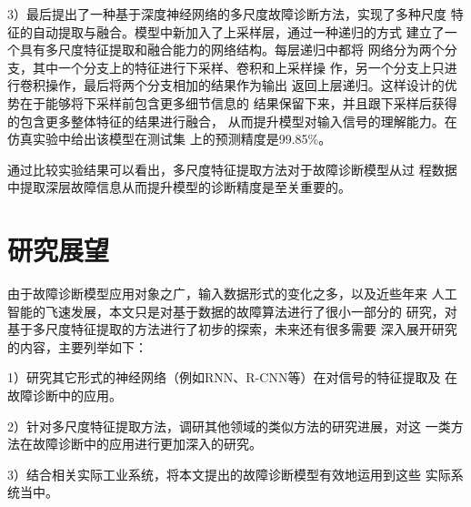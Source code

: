 3）最后提出了一种基于深度神经网络的多尺度故障诊断方法，实现了多种尺度
特征的自动提取与融合。模型中新加入了上采样层，通过一种递归的方式
建立了一个具有多尺度特征提取和融合能力的网络结构。每层递归中都将
网络分为两个分支，其中一个分支上的特征进行下采样、卷积和上采样操
作，另一个分支上只进行卷积操作，最后将两个分支相加的结果作为输出
返回上层递归。这样设计的优势在于能够将下采样前包含更多细节信息的
结果保留下来，并且跟下采样后获得的包含更多整体特征的结果进行融合，
从而提升模型对输入信号的理解能力。在仿真实验中给出该模型在测试集
上的预测精度是99.85\%。

通过比较实验结果可以看出，多尺度特征提取方法对于故障诊断模型从过
程数据中提取深层故障信息从而提升模型的诊断精度是至关重要的。

\section{研究展望}

由于故障诊断模型应用对象之广，输入数据形式的变化之多，以及近些年来
人工智能的飞速发展，本文只是对基于数据的故障算法进行了很小一部分的
研究，对基于多尺度特征提取的方法进行了初步的探索，未来还有很多需要
深入展开研究的内容，主要列举如下：

1）研究其它形式的神经网络（例如RNN、R-CNN等）在对信号的特征提取及
在故障诊断中的应用。

2）针对多尺度特征提取方法，调研其他领域的类似方法的研究进展，对这
一类方法在故障诊断中的应用进行更加深入的研究。

3）结合相关实际工业系统，将本文提出的故障诊断模型有效地运用到这些
实际系统当中。
